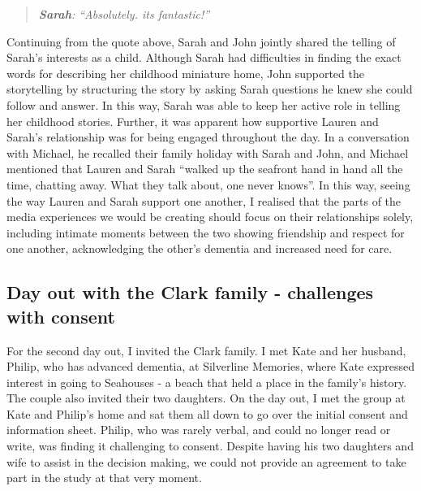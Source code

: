 \begin{quote}
\textit{    \textbf{Sarah}: ``Absolutely. its fantastic!''
}
\end{quote}

Continuing from the quote above, Sarah and John jointly shared the telling of Sarah's interests as a child. Although Sarah had difficulties in finding the exact words for describing her childhood miniature home, John supported the storytelling by structuring the story by asking Sarah questions he knew she could follow and answer. In this way, Sarah was able to keep her active role in telling her childhood stories. Further, it was apparent how supportive Lauren and Sarah's relationship was for being engaged throughout the day. In a conversation with Michael, he recalled their family holiday with Sarah and John, and Michael mentioned that Lauren and Sarah ``walked up the seafront hand in hand all the time, chatting away. What they talk about, one never knows''. In this way, seeing the way Lauren and Sarah support one another, I realised that the parts of the media experiences we would be creating should focus on their relationships solely, including intimate moments between the two showing friendship and respect for one another, acknowledging the other’s dementia and increased need for care.


\subsection{Day out with the Clark family - challenges with consent}
\label{ClarkFamily}
For the second day out, I invited the Clark family. I met Kate and her husband, Philip, who has advanced dementia, at Silverline Memories, where Kate expressed interest in going to Seahouses - a beach that held a place in the family's history. The couple also invited their two daughters. On the day out, I met the group at Kate and Philip's home and sat them all down to go over the initial consent and information sheet. Philip, who was rarely verbal, and could no longer read or write, was finding it challenging to consent. Despite having his two daughters and wife to assist in the decision making, we could not provide an agreement to take part in the study at that very moment. 

